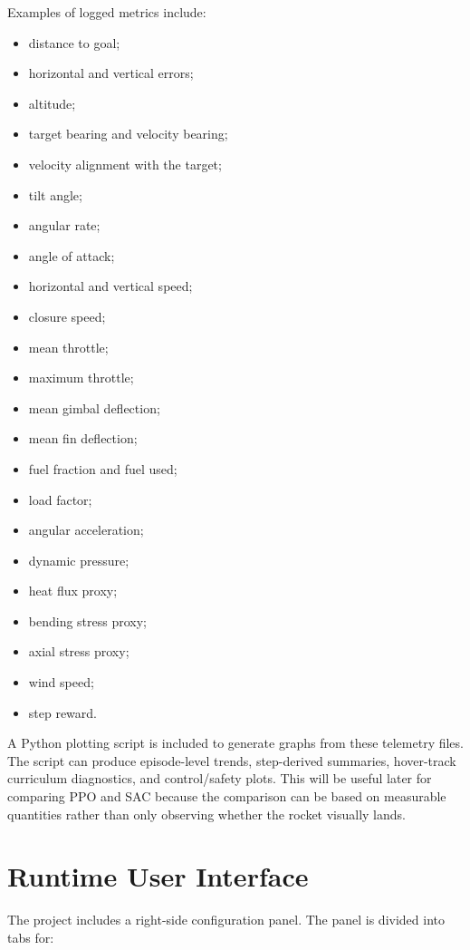 \documentclass[12pt,a4paper]{article}
\begin{document}
Examples of logged metrics include:

\begin{itemize}
    \item distance to goal;
    \item horizontal and vertical errors;
    \item altitude;
    \item target bearing and velocity bearing;
    \item velocity alignment with the target;
    \item tilt angle;
    \item angular rate;
    \item angle of attack;
    \item horizontal and vertical speed;
    \item closure speed;
    \item mean throttle;
    \item maximum throttle;
    \item mean gimbal deflection;
    \item mean fin deflection;
    \item fuel fraction and fuel used;
    \item load factor;
    \item angular acceleration;
    \item dynamic pressure;
    \item heat flux proxy;
    \item bending stress proxy;
    \item axial stress proxy;
    \item wind speed;
    \item step reward.
\end{itemize}

A Python plotting script is included to generate graphs from these telemetry files. The script can produce episode-level trends, step-derived summaries, hover-track curriculum diagnostics, and control/safety plots. This will be useful later for comparing PPO and SAC because the comparison can be based on measurable quantities rather than only observing whether the rocket visually lands.

\section{Runtime User Interface}

The project includes a right-side configuration panel. The panel is divided into tabs for:
\end{document}

